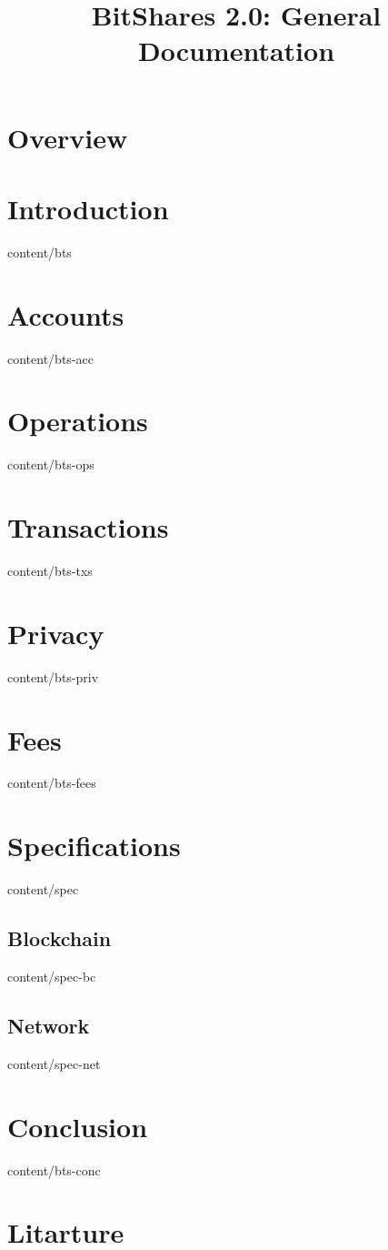 \documentclass[conference,final,10pt,a4paper]{IEEEtran}
\title{BitShares 2.0: General Documentation}
\author{}
\begin{document}
\sloppy
\maketitle

\begin{abstract}
\end{abstract}

\section{Overview}
\section    { Introduction   }  { content/bts      } 
\section    { Accounts       }  { content/bts-acc  } 
\section    { Operations     }  { content/bts-ops  } 
\section    { Transactions   }  { content/bts-txs  } 
\section    { Privacy        }  { content/bts-priv } 
\section    { Fees           }  { content/bts-fees } 
\section    { Specifications }  { content/spec     } 
\subsection { Blockchain     }  { content/spec-bc  } 
\subsection { Network        }  { content/spec-net } 
\section    { Conclusion     }  { content/bts-conc } 
\section*   { Litarture      } 
\end{document}
